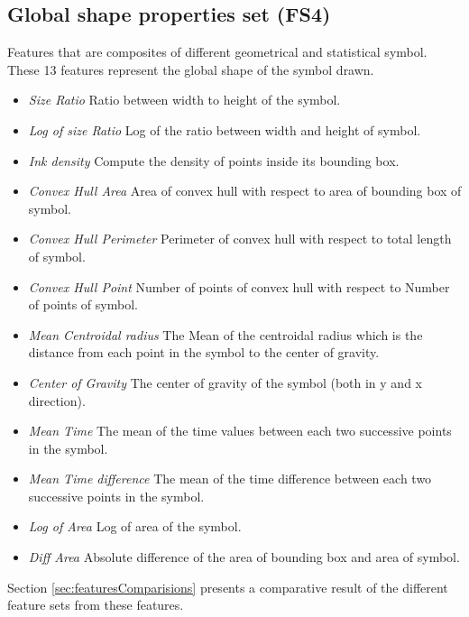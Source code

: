 \subsection{Global shape properties set (FS4)}
 Features that are composites of different geometrical and statistical symbol. These 13 features represent the global shape of the symbol drawn.

 	\begin{itemize}
\item \emph{Size Ratio} Ratio between width to height of the symbol.
		\item \emph{Log of size Ratio} Log of the ratio between width and height of symbol.
	\item \emph{Ink density} Compute the density of points inside its bounding box\cite{GeometryAndDomain102}.   
 	\item \emph{Convex Hull Area} Area of convex hull with respect to area of bounding box of symbol.
  
	\item \emph{Convex Hull Perimeter} Perimeter of convex hull with respect to total length of symbol.
		\item \emph{Convex Hull Point} Number of points of convex hull with respect to Number of points of symbol.
		\item \emph{Mean Centroidal radius} The Mean of the centroidal radius which is the distance from each point in the symbol to the center of gravity.
				\item \emph{Center of Gravity} The center of gravity of the symbol (both in y and x direction).
					\item \emph{Mean Time} The mean of the time values between each two successive points in the symbol. %
				
	\item \emph{Mean Time difference} The mean of the time difference between each two successive points in the symbol. %
			\item \emph{Log of Area} Log of area of the symbol.
	\item \emph{Diff Area} Absolute difference of the area of bounding box and area of symbol.
	
  \end{itemize}
  
 Section \ref{sec:featuresComparisions} presents a comparative result of the different feature sets from these features.

